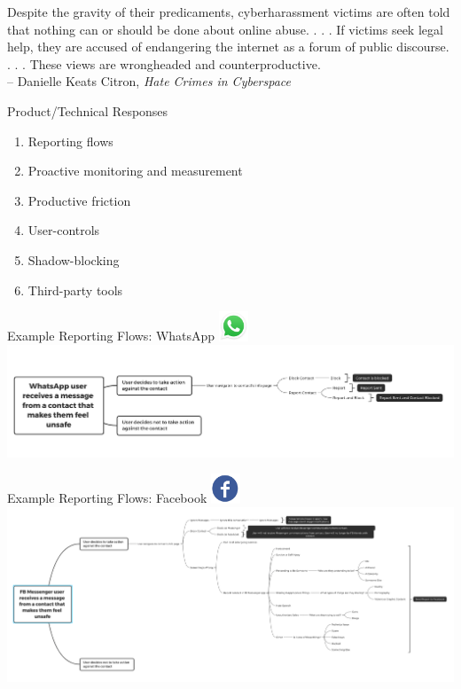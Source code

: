 \documentclass[nobackground,dvipsnames,table,aspectratio=169]{beamer}
\begin{document}
\begin{frame}{}
    Despite the gravity of their predicaments, cyberharassment victims are often told that nothing can or should be done about online abuse. . . . If victims seek legal help, they are accused of endangering the internet as a forum of public discourse. . . . These views are wrongheaded and counterproductive.\\
    – Danielle Keats Citron, \textit{Hate Crimes in Cyberspace}
\end{frame}

\begin{frame}{Product/Technical Responses}
    \begin{enumerate}
        \item Reporting flows
        \item Proactive monitoring and measurement
        \item Productive friction
        \item User-controls
        \item Shadow-blocking
        \item Third-party tools
    \end{enumerate}
\end{frame}

\begin{frame}{Example Reporting Flows: WhatsApp}
    \centering
    \includegraphics[width=25pt]{whatsapp}
    \includegraphics[width=\textwidth]{whatsapp-reporting-flow}
\end{frame}

\begin{frame}{Example Reporting Flows: Facebook}
    \centering
    \includegraphics[width=25pt]{facebook}
    \includegraphics[width=\textwidth]{facebook-reporting-flow}
\end{frame}
\end{document}

